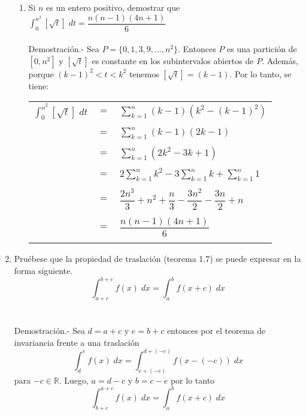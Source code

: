 \begin{enumerate}[ \bfseries 1.]
\begin{enumerate}[\bfseries (a)]
		\item Si $n$ es un entero positivo, demostrar que $\displaystyle\int_{0}^{n^2} \left[ \sqrt{t}\right] \; dt = \dfrac{n(n-1)(4n+1)}{6}$\\\\
		    Demostración.-\; Sea $P=\lbrace 0,1,3,9,...,n^2\rbrace$. Entonces $P$ es una partición de $\left[0,n^2\right]$ y $\left[\sqrt{t}\right]$ es constante en los subintervalos abiertos de $P$. Además, porque $(k-1)^2 < t < k^2$ tenemos $\left[\sqrt{t}\right]=(k-1)$. Por lo tanto, se tiene:
		    \begin{center}
			\begin{tabular}{rcl}
			    $\displaystyle\int_{0}^{n^2} \left[\sqrt{t}\right]\; dt$&$=$&$\sum\limits_{k=1}^{n} (k-1)(k^2-(k-1)^2)$\\\\
			    &$=$&$\sum\limits_{k=1}^{n}(k-1)(2k-1)$\\\\
			    &$=$&$\sum\limits_{k=1}^{n} (2k^2 - 3k + 1)$\\\\
			    &$=$&$2\sum\limits_{k=1}^{n} k^2 - 3\sum\limits_{k=1}^{n} k + \sum\limits_{k=1}^{n} 1$\\\\
			    &$=$&$\dfrac{2n^3}{3} + n^2 + \dfrac{n}{3} - \dfrac{3n^2}{2} - \dfrac{3n}{2} + n$\\\\
			    &$=$&$\dfrac{n(n-1)(4n+1)}{6}$\\\\
			\end{tabular}
		    \end{center}
	\end{enumerate}

    \item Pruébese que la propiedad de traslación (teorema 1.7) se puede expresar en la forma siguiente. $$\displaystyle\int_{a+c}^{b+c}f(x) \; dx = \int_{a}^{b}f(x+c)\; dx$$\\\\
	Demostración.-\; Sea $d=a+c$ y $e=b+c$ entonces por el teorema de invariancia frente a una traslación $$\displaystyle\int_{d}^{e} f(x) \; dx = \int_{e+(-c)}^{d+(-c)} f(x-(-c)) \; dx$$ para $-c \in \mathbb{R}$. Luego, $a=d-c$ y $b=c-e$ por lo tanto $$\displaystyle\int_{b+c}^{a+c} f(x) \; dx = \int_{a}^{b} f(x+c) \; dx$$\\\\


\end{enumerate}
